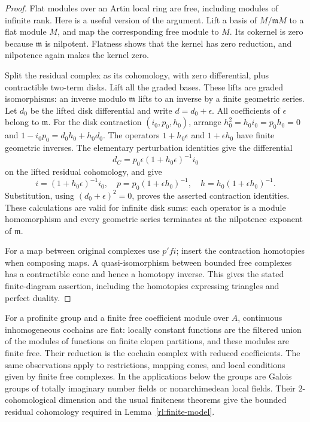 \begin{proof}
Flat modules over an Artin local ring are free, including modules of infinite
rank.  Here is a useful version of the argument.  Lift a basis of $M/\mathfrak
mM$ to a flat module $M$, and map the corresponding free module to $M$.
Its cokernel is zero because $\mathfrak m$ is nilpotent.  Flatness shows that
the kernel has zero reduction, and nilpotence again makes the kernel zero.

Split the residual complex as its cohomology, with zero differential, plus
contractible two-term disks.  Lift all the graded bases.  These lifts are
graded isomorphisms: an inverse modulo $\mathfrak m$ lifts to an inverse by
a finite geometric series.  Let $d_0$ be the lifted disk differential and
write $d=d_0+\epsilon$.  All coefficients of $\epsilon$ belong to
$\mathfrak m$.  For the disk contraction $(i_0,p_0,h_0)$, arrange
$h_0^2=h_0i_0=p_0h_0=0$ and
$1-i_0p_0=d_0h_0+h_0d_0$.  The operators
$1+h_0\epsilon$ and $1+\epsilon h_0$ have finite geometric inverses.
The elementary perturbation identities give the differential
\[
 d_C=p_0\epsilon(1+h_0\epsilon)^{-1}i_0
\]
on the lifted residual cohomology, and give
\[
 i=(1+h_0\epsilon)^{-1}i_0,\quad
 p=p_0(1+\epsilon h_0)^{-1},\quad
 h=h_0(1+\epsilon h_0)^{-1}.
\]
Substitution, using $(d_0+\epsilon)^2=0$, proves the asserted contraction
identities.  These calculations are valid for infinite disk sums: each
operator is a module homomorphism and every geometric series terminates
at the nilpotence exponent of $\mathfrak m$.

For a map between original complexes use $p'fi$; insert the contraction
homotopies when composing maps.  A quasi-isomorphism between bounded free
complexes has a contractible cone and hence a homotopy inverse.  This gives
the stated finite-diagram assertion, including the homotopies expressing
triangles and perfect duality.
\end{proof}

For a profinite group and a finite free coefficient module over $A$,
continuous inhomogeneous cochains are flat: locally constant functions are
the filtered union of the modules of functions on finite clopen partitions,
and these modules are finite free.  Their reduction is the cochain complex
with reduced coefficients.  The same observations apply to restrictions,
mapping cones, and local conditions given by finite free complexes.  In the
applications below the groups are Galois groups of totally imaginary number
fields or nonarchimedean local fields.  Their $2$-cohomological dimension and
the usual finiteness theorems give the bounded residual cohomology required
in Lemma~\ref{rl:finite-model}.

